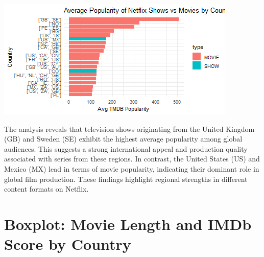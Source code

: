 \documentclass[11pt,preprint]{elsarticle}
\let\origfigure\figure
\let\endorigfigure\endfigure
\renewenvironment{figure}[1][2] {
    \expandafter\origfigure\expandafter[H]
} {
    \endorigfigure
}
\numberwithin{equation}{section}
\numberwithin{figure}{section}
\numberwithin{table}{section}
\begin{document}
\begin{figure}

{\centering \includegraphics{23084103_Netflix_files/figure-latex/Figure 1b-1} 

}

\caption{Caption Here \label{Figure1}}\label{fig:Figure 1b}
\end{figure}

The analysis reveals that television shows originating from the United
Kingdom (GB) and Sweden (SE) exhibit the highest average popularity
among global audiences. This suggests a strong international appeal and
production quality associated with series from these regions. In
contrast, the United States (US) and Mexico (MX) lead in terms of movie
popularity, indicating their dominant role in global film production.
These findings highlight regional strengths in different content formats
on Netflix.

\newpage

\section{Boxplot: Movie Length and IMDb Score by
Country}\label{boxplot-movie-length-and-imdb-score-by-country}
\end{document}
